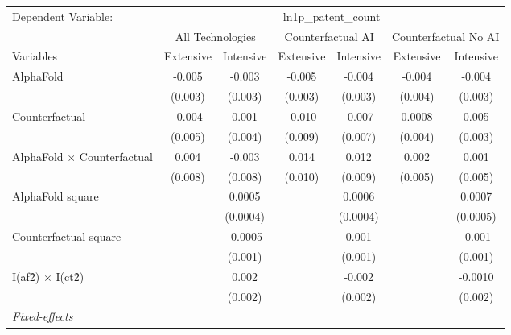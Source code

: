 \begingroup
\centering
\begin{tabular}{lcccccc}
   \tabularnewline \midrule \midrule
   Dependent Variable: & \multicolumn{6}{c}{ln1p\_patent\_count}\\
 & \multicolumn{2}{c}{All Technologies} & \multicolumn{2}{c}{Counterfactual AI} & \multicolumn{2}{c}{Counterfactual No AI} \\
\cmidrule(lr){1-1}\cmidrule(lr){2-3} \cmidrule(lr){4-5} \cmidrule(lr){6-7}
Variables & \multicolumn{1}{c}{Extensive} & \multicolumn{1}{c}{Intensive} & \multicolumn{1}{c}{Extensive} & \multicolumn{1}{c}{Intensive} & \multicolumn{1}{c}{Extensive} & \multicolumn{1}{c}{Intensive} \\
\cmidrule(lr){1-1}\cmidrule(lr){2-2} \cmidrule(lr){3-3} \cmidrule(lr){4-4} \cmidrule(lr){5-5} \cmidrule(lr){6-6} \cmidrule(lr){7-7}
   AlphaFold                          & -0.005  & -0.003   & -0.005  & -0.004   & -0.004  & -0.004\\   
                                      & (0.003) & (0.003)  & (0.003) & (0.003)  & (0.004) & (0.003)\\   
   Counterfactual                     & -0.004  & 0.001    & -0.010  & -0.007   & 0.0008  & 0.005\\   
                                      & (0.005) & (0.004)  & (0.009) & (0.007)  & (0.004) & (0.003)\\   
   AlphaFold $\times$ Counterfactual  & 0.004   & -0.003   & 0.014   & 0.012    & 0.002   & 0.001\\   
                                      & (0.008) & (0.008)  & (0.010) & (0.009)  & (0.005) & (0.005)\\   
   AlphaFold square                   &         & 0.0005   &         & 0.0006   &         & 0.0007\\   
                                      &         & (0.0004) &         & (0.0004) &         & (0.0005)\\   
   Counterfactual square              &         & -0.0005  &         & 0.001    &         & -0.001\\   
                                      &         & (0.001)  &         & (0.001)  &         & (0.001)\\   
   I(af\^2) $\times$ I(ct\^2)         &         & 0.002    &         & -0.002   &         & -0.0010\\   
                                      &         & (0.002)  &         & (0.002)  &         & (0.002)\\   
   \midrule
   \emph{Fixed-effects}\\

\end{tabular}
